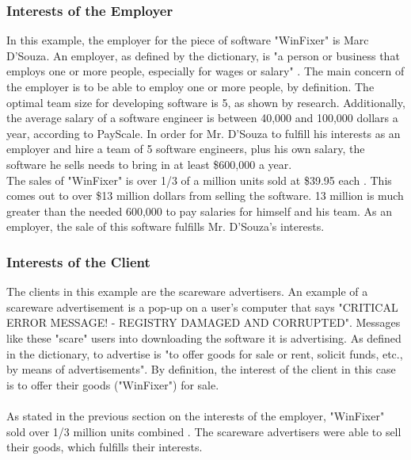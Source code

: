 \documentclass[11pt]{article}
\begin{document}
\begin{multicols}{2}
\subsubsection{Interests of the Employer}
In this example, the employer for the piece of software "WinFixer" is Marc D'Souza\cite{pcworld8.2million}. An employer, as defined by the dictionary, is "a person or business that employs one or more people, especially for wages or salary" \cite{dictionary}. The main concern of the employer is to be able to employ one or more people, by definition. The optimal team size for developing software is 5, as shown by research\cite{teamsize}. Additionally, the average salary of a software engineer is between 40,000 and 100,000 dollars a year, according to PayScale\cite{sesalary}. In order for Mr. D'Souza to fulfill his interests as an employer and hire a team of 5 software engineers, plus his own salary, the software he sells needs to bring in at least \$600,000 a year\cite{sesalary}.
\vspace{10pt}\\
The sales of "WinFixer" is over 1/3 of a million units sold at \$39.95 each \cite{pcworld8.2million}. This comes out to over \$13 million dollars from selling the software. 13 million is much greater than the needed 600,000 to pay salaries for himself and his team. As an employer, the sale of this software fulfills Mr. D'Souza's interests.
\subsubsection{Interests of the Client}
The clients in this example are the scareware advertisers. An example of a scareware advertisement is a pop-up on a user's computer that says "CRITICAL ERROR MESSAGE! - REGISTRY DAMAGED AND CORRUPTED"\cite{bbcfighting}. Messages like these "scare" users into downloading the software it is advertising. As defined in the dictionary, to advertise is "to offer goods for sale or rent, solicit funds, etc., by means of advertisements"\cite{dictionary}. By definition, the interest of the client in this case is to offer their goods ("WinFixer") for sale.\\
\vspace{10pt}\\
As stated in the previous section on the interests of the employer, "WinFixer" sold over 1/3 million units combined \cite{pcworld8.2million}. The scareware advertisers were able to sell their goods, which fulfills their interests.

\end{multicols}
\end{document}
